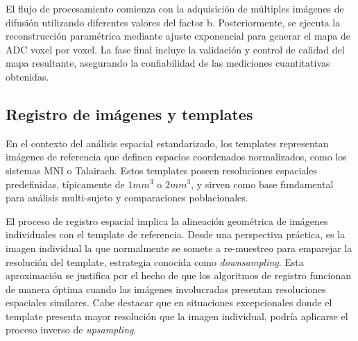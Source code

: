El flujo de procesamiento comienza con la adquisición de múltiples imágenes de difusión utilizando diferentes valores del factor b. Posteriormente, se ejecuta la reconstrucción paramétrica mediante ajuste exponencial para generar el mapa de ADC voxel por voxel. La fase final incluye la validación y control de calidad del mapa resultante, asegurando la confiabilidad de las mediciones cuantitativas obtenidas.

\subsection{Registro de imágenes y templates}
En el contexto del análisis espacial estandarizado, los templates representan imágenes de referencia que definen espacios coordenados normalizados, como los sistemas MNI o Talairach. Estos templates poseen resoluciones espaciales predefinidas, típicamente de $1mm^3$ o $2mm^3$, y sirven como base fundamental para análisis multi-sujeto y comparaciones poblacionales.

El proceso de registro espacial implica la alineación geométrica de imágenes individuales con el template de referencia. Desde una perspectiva práctica, es la imagen individual la que normalmente se somete a re-muestreo para emparejar la resolución del template, estrategia conocida como \emph{downsampling}. Esta aproximación se justifica por el hecho de que los algoritmos de registro funcionan de manera óptima cuando las imágenes involucradas presentan resoluciones espaciales similares. Cabe destacar que en situaciones excepcionales donde el template presenta mayor resolución que la imagen individual, podría aplicarse el proceso inverso de \emph{upsampling}.